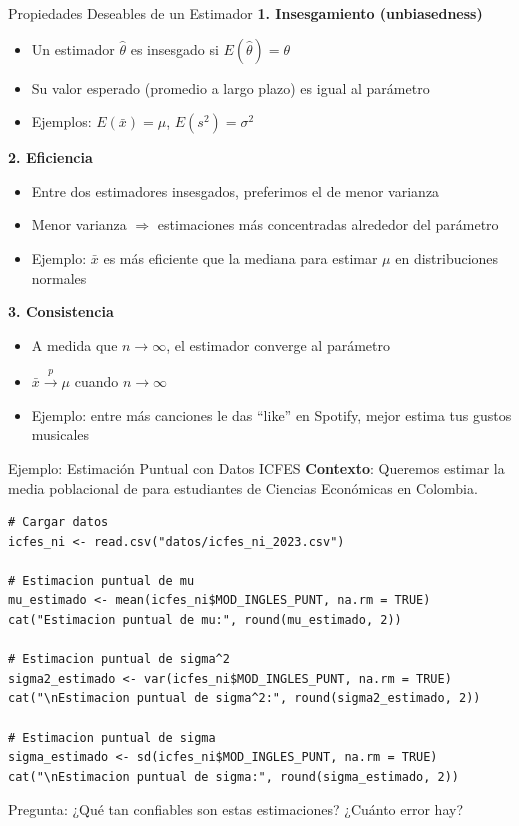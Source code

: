 \documentclass[aspectratio=169, 11pt]{beamer}
\begin{document}
\begin{frame}{Propiedades Deseables de un Estimador}
\textbf{1. Insesgamiento (unbiasedness)}
\begin{itemize}
  \item Un estimador $\hat{\theta}$ es insesgado si $E(\hat{\theta}) = \theta$
  \item Su valor esperado (promedio a largo plazo) es igual al parámetro
  \item Ejemplos: $E(\bar{x}) = \mu$, $E(s^2) = \sigma^2$
\end{itemize}

\vspace{0.3cm}
\textbf{2. Eficiencia}
\begin{itemize}
  \item Entre dos estimadores insesgados, preferimos el de \alert{menor varianza}
  \item Menor varianza $\Rightarrow$ estimaciones más concentradas alrededor del parámetro
  \item Ejemplo: $\bar{x}$ es más eficiente que la mediana para estimar $\mu$ en distribuciones normales
\end{itemize}

\vspace{0.3cm}
\textbf{3. Consistencia}
\begin{itemize}
  \item A medida que $n \to \infty$, el estimador converge al par\'ametro
  \item $\bar{x} \xrightarrow{p} \mu$ cuando $n \to \infty$
  \item Ejemplo: entre m\'as canciones le das ``like'' en Spotify, mejor estima tus gustos musicales
\end{itemize}
\end{frame}

\begin{frame}[fragile]{Ejemplo: Estimación Puntual con Datos ICFES}
\textbf{Contexto}: Queremos estimar la media poblacional de  para estudiantes de Ciencias Econ\'omicas en Colombia.

\vspace{0.15cm}
\begin{lstlisting}
# Cargar datos
icfes_ni <- read.csv("datos/icfes_ni_2023.csv")

# Estimacion puntual de mu
mu_estimado <- mean(icfes_ni$MOD_INGLES_PUNT, na.rm = TRUE)
cat("Estimacion puntual de mu:", round(mu_estimado, 2))

# Estimacion puntual de sigma^2
sigma2_estimado <- var(icfes_ni$MOD_INGLES_PUNT, na.rm = TRUE)
cat("\nEstimacion puntual de sigma^2:", round(sigma2_estimado, 2))

# Estimacion puntual de sigma
sigma_estimado <- sd(icfes_ni$MOD_INGLES_PUNT, na.rm = TRUE)
cat("\nEstimacion puntual de sigma:", round(sigma_estimado, 2))
\end{lstlisting}

\smallskip
\alert{Pregunta}: ¿Qué tan confiables son estas estimaciones? ¿Cuánto error hay?
\end{frame}
\end{document}

